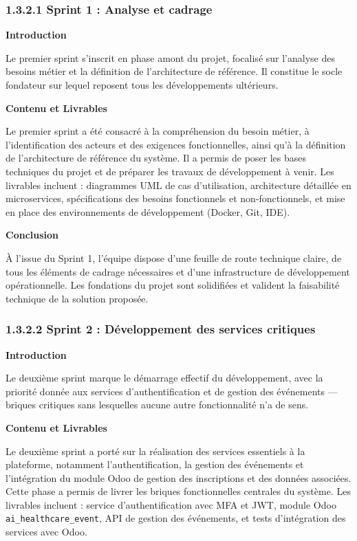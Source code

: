 \subsubsection{1.3.2.1 Sprint 1 : Analyse et cadrage}

\textbf{Introduction}

Le premier sprint s'inscrit en phase amont du projet, focalisé sur l'analyse des besoins métier et la définition de l'architecture de référence. Il constitue le socle fondateur sur lequel reposent tous les développements ultérieurs.

\textbf{Contenu et Livrables}

Le premier sprint a été consacré à la compréhension du besoin métier, à l'identification des acteurs et des exigences fonctionnelles, ainsi qu'à la définition de l'architecture de référence du système. Il a permis de poser les bases techniques du projet et de préparer les travaux de développement à venir. Les livrables incluent : diagrammes UML de cas d'utilisation, architecture détaillée en microservices, spécifications des besoins fonctionnels et non-fonctionnels, et mise en place des environnements de développement (Docker, Git, IDE).

\textbf{Conclusion}

À l'issue du Sprint 1, l'équipe dispose d'une feuille de route technique claire, de tous les éléments de cadrage nécessaires et d'une infrastructure de développement opérationnelle. Les fondations du projet sont solidifiées et valident la faisabilité technique de la solution proposée.

\subsubsection{1.3.2.2 Sprint 2 : Développement des services critiques}

\textbf{Introduction}

Le deuxième sprint marque le démarrage effectif du développement, avec la priorité donnée aux services d'authentification et de gestion des événements — briques critiques sans lesquelles aucune autre fonctionnalité n'a de sens.

\textbf{Contenu et Livrables}

Le deuxième sprint a porté sur la réalisation des services essentiels à la plateforme, notamment l'authentification, la gestion des événements et l'intégration du module Odoo de gestion des inscriptions et des données associées. Cette phase a permis de livrer les briques fonctionnelles centrales du système. Les livrables incluent : service d'authentification avec MFA et JWT, module Odoo \texttt{ai\_healthcare\_event}, API de gestion des événements, et tests d'intégration des services avec Odoo.

